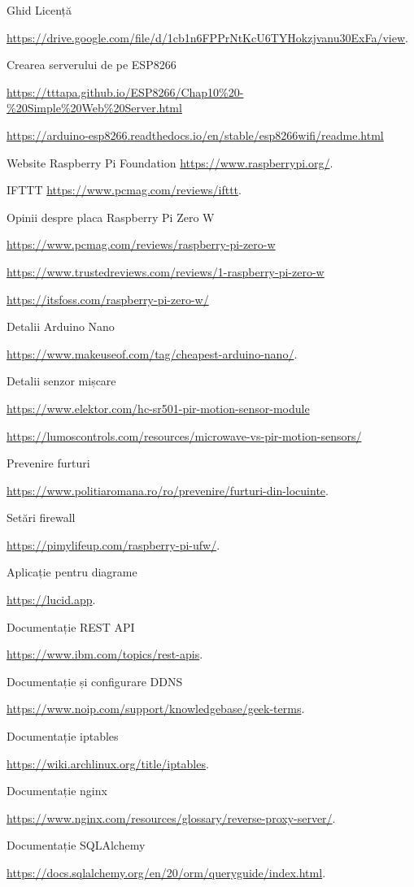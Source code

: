 \begin{thebibliography}{64}
	
	Ghid Licență 
	
	\url{https://drive.google.com/file/d/1cb1n6FPPrNtKcU6TYHokzjvanu30ExFa/view}.
	
	Crearea serverului de pe ESP8266
	
	\url{https://tttapa.github.io/ESP8266/Chap10%20-%20Simple%20Web%20Server.html}
	
	\url{https://arduino-esp8266.readthedocs.io/en/stable/esp8266wifi/readme.html}
	
	Website Raspberry Pi Foundation \url{https://www.raspberrypi.org/}.
	
	IFTTT \url{https://www.pcmag.com/reviews/ifttt}.
	
	Opinii despre placa Raspberry Pi Zero W 
	
	\url{https://www.pcmag.com/reviews/raspberry-pi-zero-w}
	
	\url{https://www.trustedreviews.com/reviews/1-raspberry-pi-zero-w}
	
	\url{https://itsfoss.com/raspberry-pi-zero-w/}
	
	Detalii Arduino Nano
	 
	\url{https://www.makeuseof.com/tag/cheapest-arduino-nano/}.
	
	Detalii senzor mișcare
	
	\url{https://www.elektor.com/hc-sr501-pir-motion-sensor-module}
	
	\url{https://lumoscontrols.com/resources/microwave-vs-pir-motion-sensors/}
	
	Prevenire furturi
	
	\url{https://www.politiaromana.ro/ro/prevenire/furturi-din-locuinte}.
	
	Setări firewall
	
	\url{https://pimylifeup.com/raspberry-pi-ufw/}.
	
	Aplicație pentru diagrame
	
	\url{https://lucid.app}.
	
	Documentație REST API
	
	\url{https://www.ibm.com/topics/rest-apis}.
	
	Documentație și configurare DDNS
	
	\url{https://www.noip.com/support/knowledgebase/geek-terms}.
	
	Documentație iptables
	
	\url{https://wiki.archlinux.org/title/iptables}.
	
	Documentație nginx
	
	\url{https://www.nginx.com/resources/glossary/reverse-proxy-server/}.
	
	Documentație SQLAlchemy
	
	\url{https://docs.sqlalchemy.org/en/20/orm/queryguide/index.html}.
\end{thebibliography}